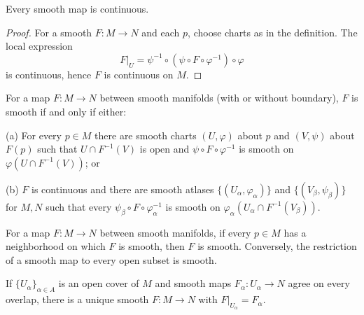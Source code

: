 \begin{proposition}
\label{prop:2-4}



Every smooth map is continuous.
\end{proposition}

\begin{proof}
\sketch For a smooth $F:M\to N$ and each $p$, choose charts as in the definition. The local expression
\[
F|_U=\psi^{-1}\circ(\psi\circ F\circ\varphi^{-1})\circ\varphi
\]
is continuous, hence $F$ is continuous on $M$.
\end{proof}

\begin{proposition}
\label{prop:2-5}



For a map $F:M\to N$ between smooth manifolds (with or without boundary), $F$ is smooth if and only if either:

(a) For every $p\in M$ there are smooth charts $(U,\varphi)$ about $p$ and $(V,\psi)$ about $F(p)$ such that $U\cap F^{-1}(V)$ is open and $\psi\circ F\circ\varphi^{-1}$ is smooth on $\varphi(U\cap F^{-1}(V))$; or

(b) $F$ is continuous and there are smooth atlases $\{(U_\alpha,\varphi_\alpha)\}$ and $\{(V_\beta,\psi_\beta)\}$ for $M,N$ such that every $\psi_\beta\circ F\circ\varphi_\alpha^{-1}$ is smooth on $\varphi_\alpha(U_\alpha\cap F^{-1}(V_\beta))$.
\end{proposition}

\begin{proposition}
\label{prop:2-6}



For a map $F:M\to N$ between smooth manifolds, if every $p\in M$ has a neighborhood on which $F$ is smooth, then $F$ is smooth. Conversely, the restriction of a smooth map to every open subset is smooth.
\end{proposition}


\begin{corollary}
\label{cor:2-8}




If $\{U_\alpha\}_{\alpha\in A}$ is an open cover of $M$ and smooth maps $F_\alpha:U_\alpha\to N$ agree on every overlap, there is a unique smooth $F:M\to N$ with $F|_{U_\alpha}=F_\alpha$.
\end{corollary}

